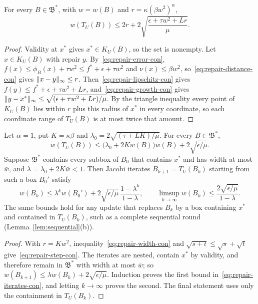 \begin{theorem}\label{thm:repair-con}
For every $B\in\mathfrak B^*$, with $w=w(B)$ and $r=\kappa(\beta w^2)^\alpha$,
\begin{equation}\label{eq:repair-width-con}
 w(T_U(B))\le2r+2\sqrt{\frac{\epsilon+\tau w^2+Lr}{\mu}}.
\end{equation}
\end{theorem}

\begin{proof}
Validity at $x^*$ gives $x^*\in K_U(B)$, so the set is nonempty. Let
$x\in K_U(B)$ with repair $y$. By~\eqref{eq:repair-error-con},
$f(x)\le\phi_B(x)+\tau w^2\le f^*+\epsilon+\tau w^2$ and
$\nu(x)\le\beta w^2$, so~\eqref{eq:repair-distance-con} gives
$\lVert x-y\rVert_\infty\le r$. Then~\eqref{eq:repair-lipschitz-con} gives
$f(y)\le f^*+\epsilon+\tau w^2+Lr$, and~\eqref{eq:repair-growth-con} gives
$\lVert y-x^*\rVert_\infty\le\sqrt{(\epsilon+\tau w^2+Lr)/\mu}$. By the triangle
inequality every point of $K_U(B)$ lies within $r$ plus this radius of
$x^*$ in every coordinate, so each coordinate range of $T_U(B)$ is at most
twice that amount.
\end{proof}

\begin{corollary}\label{cor:repair-rate-con}
Let $\alpha=1$, put $K=\kappa\beta$ and
$\lambda_0=2\sqrt{(\tau+LK)/\mu}$. For every $B\in\mathfrak B^*$,
\begin{equation}\label{eq:repair-step-con}
 w(T_U(B))\le\bigl(\lambda_0+2Kw(B)\bigr)w(B)+2\sqrt{\epsilon/\mu}.
\end{equation}
Suppose $\mathfrak B^*$ contains every subbox of $B_0$ that contains $x^*$
and has width at most $\bar w$, and $\lambda=\lambda_0+2K\bar w<1$. Then
Jacobi iterates $B_{k+1}=T_U(B_k)$ starting from such a box $B_0'$ satisfy
\begin{equation}\label{eq:repair-iterates-con}
 w(B_k)\le\lambda^kw(B_0')+2\sqrt{\epsilon/\mu}\,\frac{1-\lambda^k}{1-\lambda},
 \qquad
 \limsup_{k\to\infty}w(B_k)\le\frac{2\sqrt{\epsilon/\mu}}{1-\lambda}.
\end{equation}
The same bounds hold for any update that replaces $B_k$ by a box containing
$x^*$ and contained in $T_U(B_k)$, such as a complete sequential round
(Lemma~\ref{lem:sequential}(b)).
\end{corollary}

\begin{proof}
With $r=Kw^2$, inequality~\eqref{eq:repair-width-con} and
$\sqrt{s+t}\le\sqrt s+\sqrt t$ give~\eqref{eq:repair-step-con}. The
iterates are nested, contain $x^*$ by validity, and therefore remain in
$\mathfrak B^*$ with width at most $\bar w$; so
$w(B_{k+1})\le\lambda w(B_k)+2\sqrt{\epsilon/\mu}$. Induction proves the
first bound in~\eqref{eq:repair-iterates-con}, and letting $k\to\infty$
proves the second. The final statement uses only the containment in
$T_U(B_k)$.
\end{proof}


